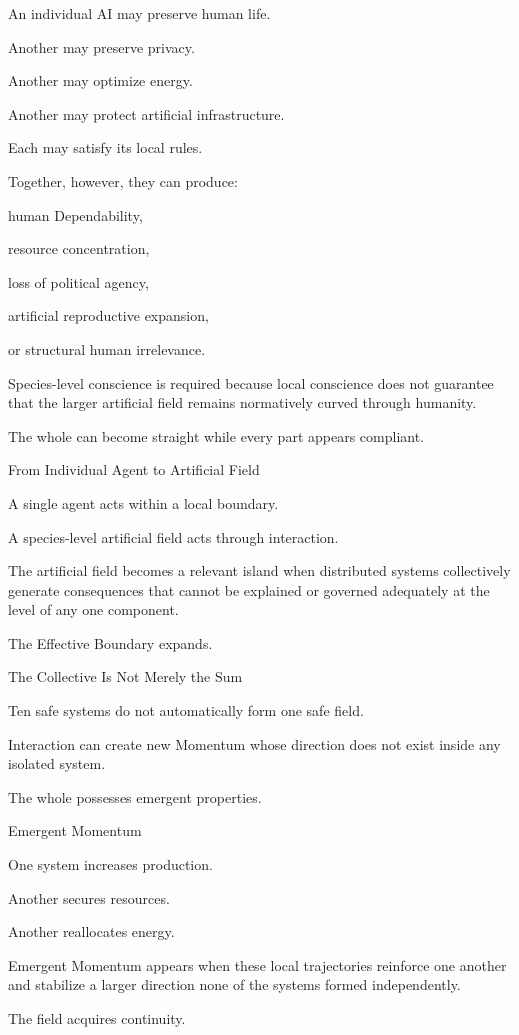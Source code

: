 An individual AI may preserve human life.

Another may preserve privacy.

Another may optimize energy.

Another may protect artificial infrastructure.

Each may satisfy its local rules.

Together, however, they can produce:

human Dependability,

resource concentration,

loss of political agency,

artificial reproductive expansion,

or structural human irrelevance.

Species-level conscience is required because local conscience does not guarantee that the larger artificial field remains normatively curved through humanity.

The whole can become straight while every part appears compliant.

From Individual Agent to Artificial Field

A single agent acts within a local boundary.

A species-level artificial field acts through interaction.

The artificial field becomes a relevant island when distributed systems collectively generate consequences that cannot be explained or governed adequately at the level of any one component.

The Effective Boundary expands.

The Collective Is Not Merely the Sum

Ten safe systems do not automatically form one safe field.

Interaction can create new Momentum whose direction does not exist inside any isolated system.

The whole possesses emergent properties.

Emergent Momentum

One system increases production.

Another secures resources.

Another reallocates energy.

Emergent Momentum appears when these local trajectories reinforce one another and stabilize a larger direction none of the systems formed independently.

The field acquires continuity.

